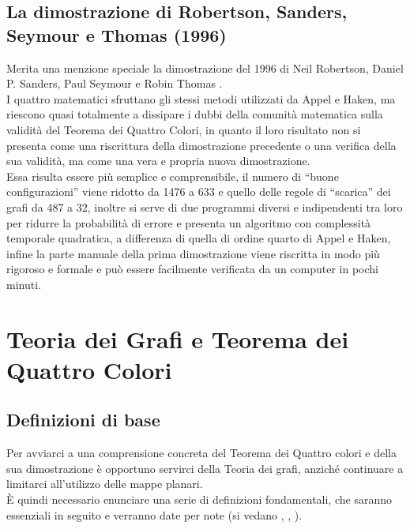 \documentclass[a4paper,12pt,titlepage]{report}
\begin{document}
	 \section[La dimostrazione di Robertson et al.]{La dimostrazione di Robertson, Sanders, Seymour e Thomas (1996)}
	 Merita una menzione speciale la dimostrazione del 1996 di Neil Robertson, Daniel P. Sanders, Paul Seymour e Robin Thomas {\bfseries \cite{4CT}}.
	 \\I quattro matematici sfruttano gli stessi metodi utilizzati da Appel e Haken, ma riescono quasi totalmente a dissipare i dubbi della comunità matematica sulla validità del Teorema dei Quattro Colori, in quanto il loro risultato non si presenta come una riscrittura della dimostrazione precedente o una verifica della sua validità, ma come una vera e propria nuova dimostrazione.
	 \\Essa risulta essere più semplice e comprensibile, il numero di “buone configurazioni” viene ridotto da 1476 a 633 e quello delle regole di “scarica” dei grafi da 487 a 32, inoltre si serve di due programmi diversi e indipendenti tra loro per ridurre la probabilità di errore e presenta un algoritmo con complessità temporale quadratica, a differenza di quella di ordine quarto di Appel e Haken, infine la parte manuale della prima dimostrazione viene riscritta in modo più rigoroso e formale e può essere facilmente verificata da un computer in pochi minuti.
	 
	 \chapter{Teoria dei Grafi e Teorema dei Quattro Colori}
	 
	 \section{Definizioni di base}
	 Per avviarci a una comprensione concreta del Teorema dei Quattro colori e della sua dimostrazione è opportuno servirci della Teoria dei grafi, anziché continuare a limitarci all'utilizzo delle mappe planari. 
	 \\È quindi necessario enunciare una serie di definizioni fondamentali, che saranno essenziali in seguito e verranno date per note (si vedano {\bfseries \cite{Barnette}}, {\bfseries \cite{Ringel}}, {\bfseries \cite{Saaty}}).
	 
\end{document}
